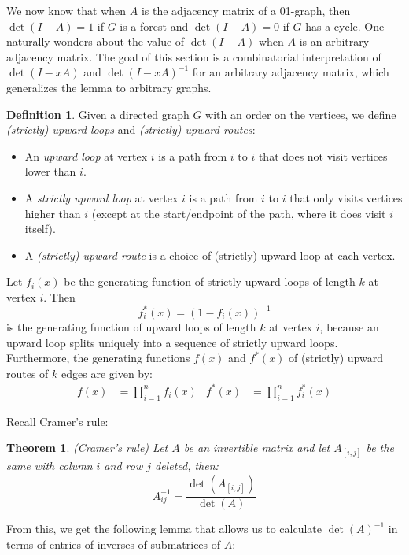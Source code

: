 \documentclass[a4paper, 11pt]{article}
\newtheorem{theorem}{Theorem}[section]
\theoremstyle{definition}
\newtheorem{definition}{Definition}[section]
\begin{document}
We now know that when $A$ is the adjacency matrix of a 01-graph, then $\det(I - A) = 1$ if $G$ is a forest and $\det(I - A) = 0$ if $G$ has a cycle. One naturally wonders about the value of $\det(I - A)$ when $A$ is an arbitrary adjacency matrix. The goal of this section is a combinatorial interpretation of $\det(I - xA)$ and $\det(I - xA)^{-1}$ for an arbitrary adjacency matrix, which generalizes the lemma to arbitrary graphs.

\begin{definition}
  Given a directed graph $G$ with an order on the vertices, we define \emph{(strictly) upward loops} and \emph{(strictly) upward routes}:
  \begin{itemize}
    \item An \emph{upward loop} at vertex $i$ is a path from $i$ to $i$ that does not visit vertices lower than $i$.
    \item A \emph{strictly upward loop} at vertex $i$ is a path from $i$ to $i$ that only visits vertices higher than $i$ (except at the start/endpoint of the path, where it does visit $i$ itself).
    \item A \emph{(strictly) upward route} is a choice of (strictly) upward loop at each vertex.
  \end{itemize}
  Let $f_i(x)$ be the generating function of strictly upward loops of length $k$ at vertex $i$. Then \[ f^{*}_i(x) = (1 - f_i(x))^{-1} \] is the generating function of upward loops of length $k$ at vertex $i$, because an upward loop splits uniquely into a sequence of strictly upward loops. Furthermore, the generating functions $f(x)$ and $f^{*}(x)$ of (strictly) upward routes of $k$ edges are given by:
  \begin{align*}
    f(x) &= \prod_{i=1}^n f_i(x) &
    f^{*}(x) &= \prod_{i=1}^n f^{*}_i(x)
  \end{align*}
\end{definition}

Recall Cramer's rule:
\begin{theorem} (Cramer's rule)
  Let $A$ be an invertible matrix and let $A_{[i,j]}$ be the same with column $i$ and row $j$ deleted, then:
  \[ A^{-1}_{ij} = \frac{\det(A_{[i,j]})}{\det(A)} \]
\end{theorem}

From this, we get the following lemma that allows us to calculate $\det(A)^{-1}$ in terms of entries of inverses of submatrices of $A$:
\end{document}

